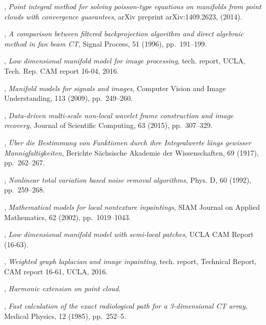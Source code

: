 \documentclass[letterpaper,10pt]{article}
\begin{document}
\begin{thebibliography}{10}
, {\em Point integral method for solving
  poisson-type equations on manifolds from point clouds with convergence
  guarantees}, arXiv preprint arXiv:1409.2623,  (2014).

, {\em A comparison between
  filtered backprojection algorithm and direct algebraic method in fan beam
  {CT}}, Signal Process, 51 (1996), pp.~191--199.

, {\em Low dimensional manifold model for
  image processing}, tech. report, UCLA, Tech. Rep. CAM report 16-04, 2016.

, {\em Manifold models for signals and images}, Computer
  Vision and Image Understanding, 113 (2009), pp.~249--260.

, {\em Data-driven multi-scale non-local
  wavelet frame construction and image recovery}, Journal of Scientific
  Computing, 63 (2015), pp.~307--329.

, {\em {{\"{U}}ber die Bestimmung von Funktionen durch ihre
  Integralwerte l{\"{a}}ngs gewisser Mannigfaltigkeiten}}, Berichte
  S{\"{a}}chsische Akademie der Wissenschaften, 69 (1917), pp.~262--267.

, {\em {Nonlinear total variation based
  noise removal algorithms}}, Phys. D, 60 (1992), pp.~259--268.

, {\em Mathematical models for local nontexture
  inpaintings}, SIAM Journal on Applied Mathematics, 62 (2002), pp.~1019--1043.

, {\em Low dimensional manifold model with
  semi-local patches}, UCLA CAM Report (16-63).

, {\em Weighted graph laplacian and image
  inpainting}, tech. report, Technical Report, CAM report 16-61, UCLA, 2016.

, {\em Harmonic extension on point cloud}.

, {\em Fast calculation of the exact radiological path for a
  3-dimensional {CT} array}, Medical Physics, 12 (1985), pp.~252--5.


\end{thebibliography}
\end{document}
